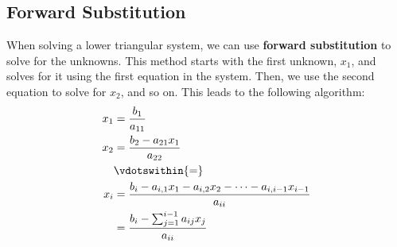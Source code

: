 \documentclass{article}
\begin{document}
\subsection{Forward Substitution}
When solving a lower triangular system, we can use \textbf{forward substitution} to solve for the unknowns.
This method starts with the first unknown, \(x_1\), and solves for it using the first equation in the system.
Then, we use the second equation to solve for \(x_2\), and so on.
This leads to the following algorithm:
\begin{align*}
    x_1 & = \frac{b_1}{a_{11}}                                                                 \\
    x_2 & = \frac{b_2 - a_{21} x_1}{a_{22}}                                                    \\
        & \vdotswithin{=}                                                                      \\
    x_i & = \frac{b_i - a_{i, 1} x_1 - a_{i, 2} x_2 - \cdots - a_{i, i - 1} x_{i - 1}}{a_{ii}} \\
        & = \frac{b_i - \sum_{j = 1}^{i - 1} a_{ij} x_j}{a_{ii}}                               \\
\end{align*}
\end{document}
